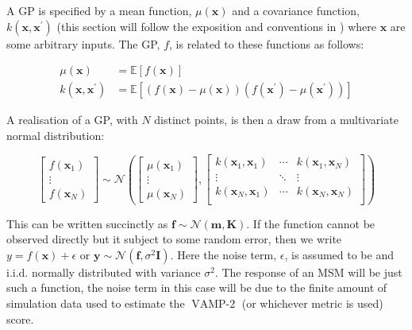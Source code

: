 A GP is specified by a mean function, $\mu(\mathbf{x})$ and a covariance function, $k(\mathbf{x}, \mathbf{x}^{\prime})$ (this section will follow the exposition and conventions in \cite{rasmussenGaussianProcessesMachine2006}) where $\mathbf{x}$ are some arbitrary inputs. The GP, $f$, is related to these functions as follows: 

\begin{equation}
    \begin{aligned}
    \mu\left(\mathbf{x}\right) &=\mathbb{E}\left[f\left(\mathbf{x}\right)\right] \\
    k\left(\mathbf{x}, \mathbf{x}^{\prime}\right) &=\mathbb{E}\left[(f(\mathbf{x})-\mu(\mathbf{x}))\left(f\left(\mathbf{x}^{\prime}\right)-\mu\left(\mathbf{x}^{\prime}\right)\right)\right]
    \end{aligned}
\end{equation}

A realisation of a GP, with $N$ distinct points, is then a draw from a multivariate normal distribution: 

\begin{equation}
\begin{bmatrix}  f\left(\mathbf{x}_{1}\right) \\ \vdots \\ f\left(\mathbf{x}_{N}\right) \end{bmatrix} 
\sim 
\mathcal{N}\left( 
\begin{bmatrix} \mu\left(\mathbf{x}_{1}\right) \\  \vdots \\ \mu\left(\mathbf{x}_{N}\right) \end{bmatrix}, 
\begin{bmatrix}
k(\mathbf{x}_{1}, \mathbf{x}_{1}) & \cdots & k(\mathbf{x}_{1}, \mathbf{x}_{N}) \\
\vdots & \ddots & \vdots \\
k(\mathbf{x}_{N}, \mathbf{x}_{1}) & \cdots & k(\mathbf{x}_{N}, \mathbf{x}_{N}) \\
\end{bmatrix}
\right)
\end{equation}

This can be written succinctly as $\mathbf{f} \sim \mathcal{N}(\mathbf{m}, \mathbf{K})$. If the function cannot be observed directly but it subject to some random error, then we write $y = f(\mathbf{x}) + \epsilon$ or  $\mathbf{y} \sim \mathcal{N}(\mathbf{f}, \sigma^{2}\mathbf{I})$. Here the noise term, $\epsilon$, is assumed to be and i.i.d. normally distributed with variance $\sigma^{2}$. The response of an MSM will be just such a function, the noise term in this case will be due to the finite amount of simulation data used to estimate the $\operatorname{VAMP-2}$ (or whichever metric is used) score. 

